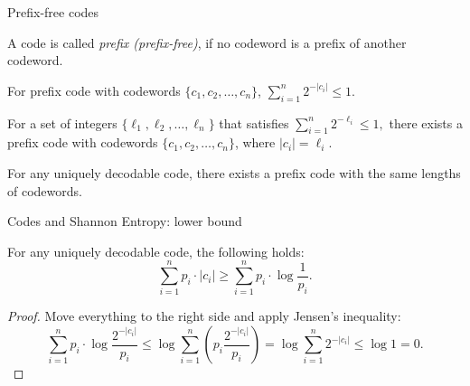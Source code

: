\documentclass[aspectratio=169]{beamer}
\newcommand{\seqn}[2]{{#1}_1,{#1}_2,\dotsc,{#1}_{#2}}
\begin{document}
    \begin{frame}{Prefix-free codes}
        \begin{definition}
            A code is called \emph{prefix (prefix-free)}, if no
            codeword is a prefix of another codeword.
        \end{definition}
        \pause
        \begin{theorem}\label{thm:mcmill}
            For prefix code with codewords
            \(\{\seqn{c}{n}\}\), $\sum_{i=1}^{n} 2^{-|c_i|} \le 1.$
        \end{theorem}
        \pause
        \begin{theorem}
            For a set of integers
            \(\{\seqn{\ell}{n}\}\)
            that satisfies
            $
            \sum_{i=1}^{n} 2^{-\ell_i} \le 1,
            $
            there exists a prefix code with codewords \(\{\seqn{c}{n}\}\), where \(|c_i| = \ell_i\).
        \end{theorem}
        \pause
        \begin{corollary}
            For any uniquely decodable code, there exists a prefix code with the same
            lengths of codewords.
        \end{corollary}
    \end{frame}

    \begin{frame}{Codes and Shannon Entropy: lower bound}
        \begin{theorem}[Shannon]
            For any uniquely decodable code, the following holds:
            \[
            \sum_{i=1}^n p_i \cdot |c_i| \ge \sum_{i=1}^n p_i \cdot \log \frac{1}{p_i}.
            \]
        \end{theorem}
        \begin{proof}
            Move everything to the right side and apply Jensen's inequality:
            \[
            \sum_{i=1}^n p_i \cdot \log \frac{2^{-|c_i|}}{p_i} \le
            \log \sum_{i=1}^n \left(p_i \frac{2^{-|c_i|}}{p_i}\right) =
            \log \sum_{i=1}^n 2^{-|c_i|} \le \log 1 = 0.
            \]
        \end{proof}
    \end{frame}
\end{document}
